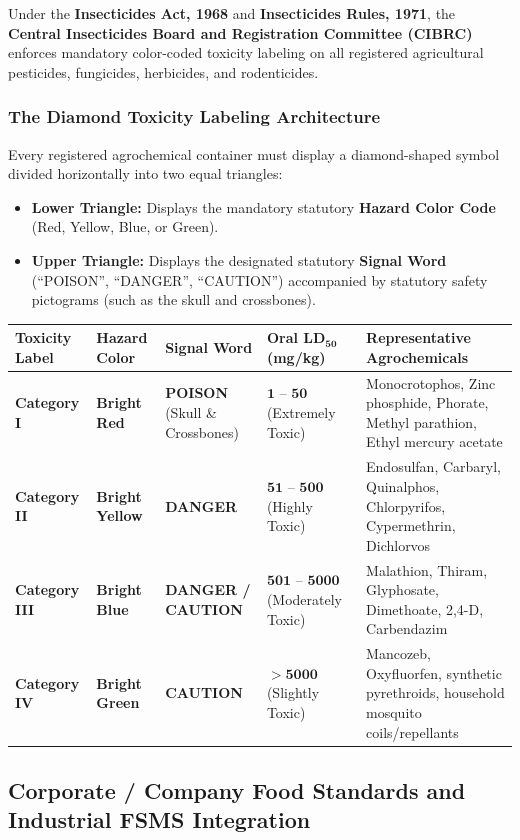 \documentclass[11pt,a4paper,oneside]{article}
\begin{document}
Under the \textbf{Insecticides Act, 1968} and \textbf{Insecticides Rules, 1971}, the \textbf{Central Insecticides Board and Registration Committee (CIBRC)} enforces mandatory color-coded toxicity labeling on all registered agricultural pesticides, fungicides, herbicides, and rodenticides.

\subsubsection{The Diamond Toxicity Labeling Architecture}
Every registered agrochemical container must display a diamond-shaped symbol divided horizontally into two equal triangles:
\begin{itemize}[leftmargin=*]
    \item \textbf{Lower Triangle:} Displays the mandatory statutory \textbf{Hazard Color Code} (Red, Yellow, Blue, or Green).
    \item \textbf{Upper Triangle:} Displays the designated statutory \textbf{Signal Word} (``POISON'', ``DANGER'', ``CAUTION'') accompanied by statutory safety pictograms (such as the skull and crossbones).
\end{itemize}

\begin{center}
\begin{tabular}{@{}p{2.2cm} p{2.2cm} p{2.8cm} p{3.2cm} p{5.0cm}@{}}
\toprule
\textbf{Toxicity Label} & \textbf{Hazard Color} & \textbf{Signal Word} & \textbf{Oral $\mathbf{LD_{50}}$ (mg/kg)} & \textbf{Representative Agrochemicals} \tabularnewline
\midrule
\textbf{Category I} & \textbf{Bright Red} & \textbf{POISON} (Skull \& Crossbones) & $\mathbf{1\text{ -- }50}$ (Extremely Toxic) & Monocrotophos, Zinc phosphide, Phorate, Methyl parathion, Ethyl mercury acetate \tabularnewline
\textbf{Category II} & \textbf{Bright Yellow} & \textbf{DANGER} & $\mathbf{51\text{ -- }500}$ (Highly Toxic) & Endosulfan, Carbaryl, Quinalphos, Chlorpyrifos, Cypermethrin, Dichlorvos \tabularnewline
\textbf{Category III} & \textbf{Bright Blue} & \textbf{DANGER / CAUTION} & $\mathbf{501\text{ -- }5000}$ (Moderately Toxic) & Malathion, Thiram, Glyphosate, Dimethoate, 2,4-D, Carbendazim \tabularnewline
\textbf{Category IV} & \textbf{Bright Green} & \textbf{CAUTION} & $\mathbf{> 5000}$ (Slightly Toxic) & Mancozeb, Oxyfluorfen, synthetic pyrethroids, household mosquito coils/repellants \tabularnewline
\bottomrule
\end{tabular}
\end{center}

\subsection{Corporate / Company Food Standards and Industrial FSMS Integration}
\end{document}
